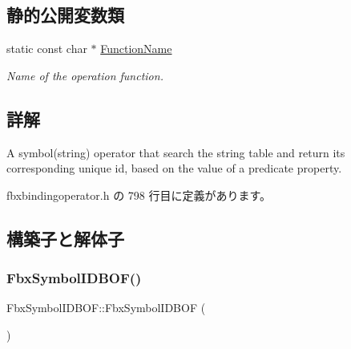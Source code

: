 \subsection*{静的公開変数類}
\begin{DoxyCompactItemize}
\item 
static const char $\ast$ \hyperlink{class_fbx_symbol_i_d_b_o_f_a7f5ac03e2e8bb5358dff19973afee349}{Function\+Name}
\begin{DoxyCompactList}\small\item\em Name of the operation function. \end{DoxyCompactList}\end{DoxyCompactItemize}


\subsection{詳解}
A symbol(string) operator that search the string table and return its corresponding unique id, based on the value of a predicate property. 

 fbxbindingoperator.\+h の 798 行目に定義があります。



\subsection{構築子と解体子}
\mbox{\label{class_fbx_symbol_i_d_b_o_f_a45254540be4b921c3aaad8047666df1a}} 
\subsubsection{\texorpdfstring{Fbx\+Symbol\+I\+D\+B\+O\+F()}{FbxSymbolIDBOF()}}
{\footnotesize\ttfamily Fbx\+Symbol\+I\+D\+B\+O\+F\+::\+Fbx\+Symbol\+I\+D\+B\+OF (\begin{DoxyParamCaption}{ }\end{DoxyParamCaption})}

\mbox{\label{class_fbx_symbol_i_d_b_o_f_aec3c76be513ae86eb878c1d7bd3f0847}} 
